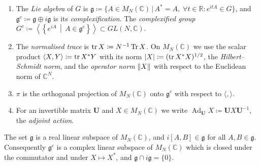 \documentclass[11pt]{preprint}
\makeatletter
\newcommand{\Ad}{\operatorname{Ad}}
\DeclarePairedDelimiter{\abs}{\lvert}{\rvert}
\DeclarePairedDelimiter{\norm}{\lVert}{\rVert}
\newcommand*{\bigcdot}{}%
\DeclareRobustCommand*{\bigcdot}{%
	\mathbin{\mathpalette\bigcdot@{}}%
}
\newcommand*{\bigcdot@scalefactor}{.7}
\newcommand*{\bigcdot@widthfactor}{1.15}
\newcommand*{\bigcdot@}[2]{%
	\sbox0{$#1\vcenter{}$}%
	\sbox2{$#1\cdot\m@th$}%
	\hbox to \bigcdot@widthfactor\wd2{%
		\hss
		\raise\ht0\hbox{%
			\scalebox{\bigcdot@scalefactor}{%
				\lower\ht0\hbox{$#1\bullet\m@th$}%
			}%
		}%
		\hss
	}%
}
\numberwithin{equation}{section}
\makeatother
\begin{document}
\begin{definition}\label{def:group}
\begin{enumerate}[label=(\roman*)]
\item The \emph{Lie algebra} of $G$ is $\mathfrak g \coloneqq \{ A \in M_N(\mathbb C) \,|\, A^* = A , \; \forall t \in \mathbb{R} : e^{itA} \in G  \}$, and $\mathfrak g^c \coloneqq \mathfrak{g} \oplus i \mathfrak{g}$ is its \emph{complexification}. The \emph{complexified group} $G^c \coloneqq \left\langle\left\{ e^{ i A } \, \middle| \, A \in \mathfrak{g}^c  \right\}\right\rangle \subset GL(N, \mathbb C)$.
\item The \emph{normalised trace} is $\operatorname{tr} X \coloneqq N^{-1}\operatorname{Tr} X$. On $M_N(\mathbb C)$ we use the scalar product $\langle X, Y\rangle \coloneqq \operatorname{tr} X^*Y$ with its norm $\abs X \coloneqq (\tr X^*X)^{1/2}$, the \emph{Hilbert--Schmidt norm}, and the \emph{operator norm} $\norm X$ with respect to the Euclidean norm of $\mathbb C^N$.
\item $\pi$ is the orthogonal projection of $M_N(\mathbb C)$ onto $\mathfrak g^c$ with respect to $\langle\bigcdot, \bigcdot\rangle$.
\item For an invertible matrix $\mathbf U$ and $X \in M_N(\mathbb C)$ we write $\Ad_{\mathbf U}X \coloneqq \mathbf UX\mathbf U^{-1}$, the \emph{adjoint action}.
\end{enumerate}
\end{definition}

\begin{lemma}\label{lem:lie-algebra}
The set $\mathfrak g$ is a real linear subspace of $M_N(\mathbb C)$, and $i[A, B] \in \mathfrak g$ for all $A, B \in \mathfrak g$. Consequently $\mathfrak g^c$ is a complex linear subspace of $M_N(\mathbb C)$ which is closed under the commutator and under $X \mapsto X^*$, and $\mathfrak g \cap i\mathfrak g = \{ 0 \}$.
\end{lemma}
\end{document}
